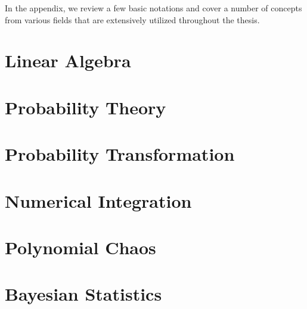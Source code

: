 In the appendix, we review a few basic notations and cover a number of concepts
from various fields that are extensively utilized throughout the thesis.

\section{Linear Algebra}

\section{Probability Theory}

\section{Probability Transformation}

\section{Numerical Integration}

\section{Polynomial Chaos}

\section{Bayesian Statistics}
